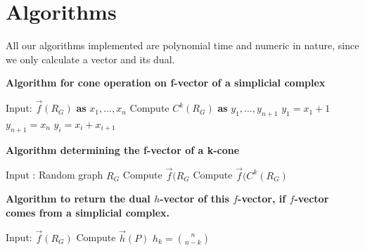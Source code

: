\documentclass[oneside,12pt]{amsart}
\theoremstyle{definition}
\numberwithin{equation}{section}
\begin{document}
\section{Algorithms} \label{algorithms} All our algorithms implemented are polynomial time and numeric in nature, since we only calculate a vector and its dual. 


%
\begin{center}
\textbf{Algorithm for cone operation on f-vector of a simplicial complex}
\end{center}

\vspace{.1in}

\begin{algorithmic}
\State Input:  $\overrightarrow{f}(R_G)$ \textbf{as} $x_1,\dots,x_n$
\State Compute  $C^{k}(R_G)$ \textbf{as} $y_1,\dots,y_{n+1}$
 \State $y_1 = x_1 + 1$
 \State $y_{n+1} = x_n$
\Else 
 \State $y_i = x_i + x_{i+1}$
\EndIf
\EndFor
\end{algorithmic}

\vspace{.5in}



\begin{center}
\textbf{Algorithm determining the f-vector of a k-cone}
\end{center}

\vspace{.1in}
\begin{algorithmic}
\State Input : Random graph $R_G$
\State Compute $\overrightarrow{f}(R_G$
\State Compute $\overrightarrow{f}(C^k(R_G)$
\EndFor
\end{algorithmic}

\vspace{.5in}

\begin{center}
\textbf{Algorithm to return the dual $h$-vector of this $f$-vector, if $f$-vector comes from a simplicial complex.}
\end{center}

\vspace{.1in}

\begin{algorithmic}
\State Input: $\overrightarrow{f}(R_G)$
\State Compute $\overrightarrow{h}(P)$
\State    $h_k = {n \choose n-k}$
\Else
{}%
\EndIf
\EndFor
\EndFor

\end{algorithmic}
\end{document}
